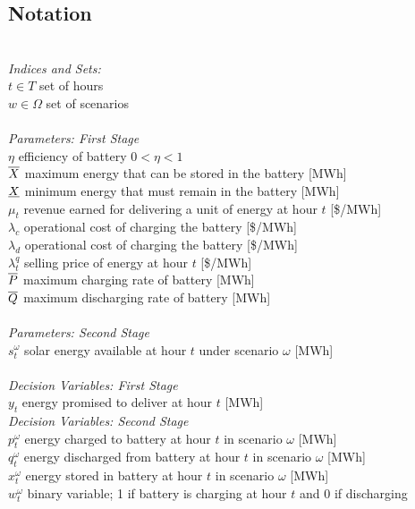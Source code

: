 \subsection{Notation} \label{sec: notation}
\begin{tabbing}
\hspace{0.7in} \= \\
{\em Indices and Sets:} \\
$t \in T$ \> set of hours\\
$w \in \Omega$ \> set of scenarios \\ \\
{\em Parameters: First Stage} \> \\
$\eta$ \> efficiency of battery $ 0< \eta <1 $   \\
${\overline{X}}$ \>  maximum energy that can be stored in the battery [MWh] \\ 
${\underline{X}}$ \>  minimum energy that must remain in the battery [MWh] \\ 

$\mu_t$ \> revenue earned for delivering a unit of energy at hour $t$ [\$/MWh] \\
$\lambda_c$ \> operational cost of charging the battery [\$/MWh] \\
$\lambda_d$ \> operational cost of charging the battery  [\$/MWh] \\ 

$\lambda_t^q$ \> selling price of energy at hour $t$ [\$/MWh]\\ 
${\overline{P}}$ \> maximum charging rate of  battery [MWh] \\
${\overline{Q}}$ \> maximum discharging rate  of battery  [MWh] \\ \\
{\em Parameters: Second Stage} \> \\
$s_t^\omega$ \> solar energy available at hour $t$ under scenario $\omega$ [MWh]   \\ \\

{\em Decision Variables: First Stage} \> \\
$y_t$ \> energy promised to deliver at hour $t$ [MWh]  \\

{\em Decision Variables: Second Stage} \> \\

$p_t^\omega$ \> energy charged to battery at hour $t$ in scenario $\omega$ [MWh]  \\
$q_t^\omega$ \> energy discharged from battery at hour $t$ in scenario $\omega$ [MWh]  \\
$x_t^\omega$ \> energy stored in battery at hour $t$ in scenario $\omega$ [MWh]  \\
$w_t^\omega$ \> binary variable; 1 if battery is charging at hour $t$ and 0 if discharging
\end{tabbing}

